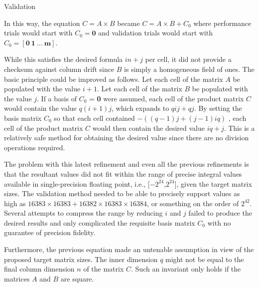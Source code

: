 \documentclass{article}
\begin{document}
\begin{section}{Validation}
\begin{paragraph}{}
    In this way, the equation $C = A \times B$ became $C = A \times B + C_{0}$ where performance trials would start with
    $C_{0} = \textbf{0}$ and validation trials would start with $C_{0} = [\textbf{0}\ \textbf{1}\ \ldots\ \textbf{m}]$.
  \end{paragraph}
  \begin{paragraph}{}
    While this satisfies the desired formula $in + j$ per cell, it did not provide a checksum against column drift
    since $B$ is simply a homogeneous field of ones. The basic principle could be improved as follows. Let each cell of the matrix
    $A$ be populated with the value $i + 1$. Let each cell of the matrix $B$ be populated with the value $j$. If a basis
    of $C_{0}$ = \textbf{0} were assumed, each cell of the product matrix $C$ would contain the value $q(i + 1)j$, which expands to
    $qij + qj$. By setting the basis matrix $C_{0}$ so that each cell contained $-((q-1)j + (j-1)iq)$ , each cell of the product matrix $C$
    would then contain the desired value $iq + j$. This is a relatively safe method for obtaining the desired value since there are no
    division operations required.
  \end{paragraph}
  \begin{paragraph}{}
    The problem with this latest refinement and even all the previous refinements is that the resultant values did not fit within the range of precise integral
    values available in single-precision floating point, i.e., [$-2^{24}$,$2^{24}$]\autocite{SPIntLimit}, given the target matrix sizes. The validation
    method needed to be able to precisely support values as high as $16383 \times 16383 + 16382 \times 16383 \times 16384$, or something on the order
    of $2^{42}$. Several attempts to compress the range by reducing $i$ and $j$ failed to produce the desired results and only complicated the requisite
    basis matrix $C_{0}$ with no guarantee of precision fidelity.
  \end{paragraph}
  \begin{paragraph}{}
    Furthermore, the previous equation made an untenable assumption in view of the proposed target matrix sizes. The inner dimension $q$ might not
    be equal to the final column dimension $n$ of the matrix $C$. Such an invariant only holds if the matrices $A$ and $B$ are square.
  \end{paragraph}
\end{section}
\end{document}

